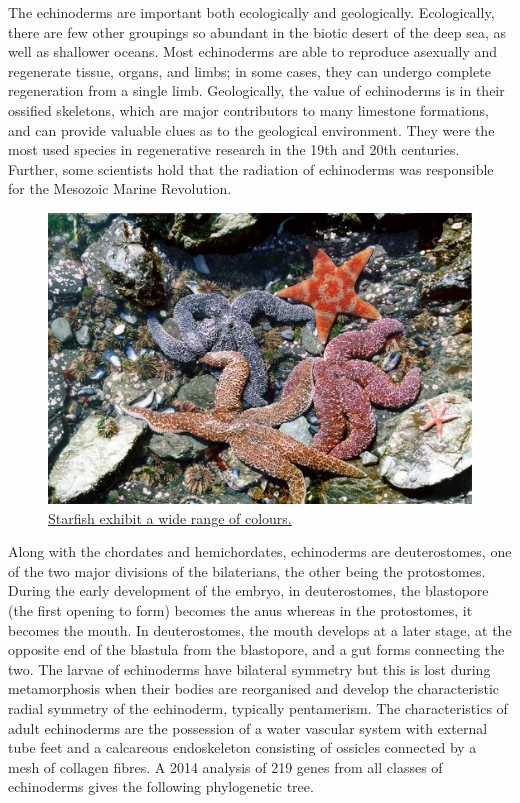 The echinoderms are important both ecologically and geologically. Ecologically, there are few other groupings so abundant in the biotic desert of the deep sea, as well as shallower oceans. Most echinoderms are able to reproduce asexually and regenerate tissue, organs, and limbs; in some cases, they can undergo complete regeneration from a single limb. Geologically, the value of echinoderms is in their ossified skeletons, which are major contributors to many limestone formations, and can provide valuable clues as to the geological environment. They were the most used species in regenerative research in the 19th and 20th centuries. Further, some scientists hold that the radiation of echinoderms was responsible for the Mesozoic Marine Revolution.



\begin{figure}

{\centering \includegraphics[width=0.7\linewidth]{./figures/animals/Nerr0878} 

}

\caption{\href{https://commons.wikimedia.org/wiki/File:Nerr0878.jpg}{Starfish exhibit a wide range of colours.}}\label{fig:starfish}
\end{figure}

Along with the chordates and hemichordates, echinoderms are deuterostomes, one of the two major divisions of the bilaterians, the other being the protostomes. During the early development of the embryo, in deuterostomes, the blastopore (the first opening to form) becomes the anus whereas in the protostomes, it becomes the mouth. In deuterostomes, the mouth develops at a later stage, at the opposite end of the blastula from the blastopore, and a gut forms connecting the two. The larvae of echinoderms have bilateral symmetry but this is lost during metamorphosis when their bodies are reorganised and develop the characteristic radial symmetry of the echinoderm, typically pentamerism. The characteristics of adult echinoderms are the possession of a water vascular system with external tube feet and a calcareous endoskeleton consisting of ossicles connected by a mesh of collagen fibres. A 2014 analysis of 219 genes from all classes of echinoderms gives the following phylogenetic tree.

